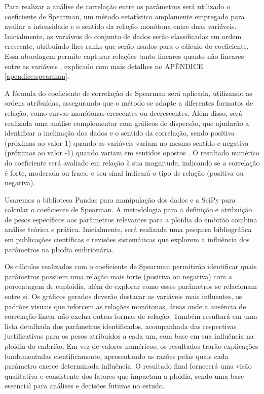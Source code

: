 Para realizar a análise de correlação entre os parâmetros será utilizado o coeficiente de Spearman, um método estatístico amplamente empregado para avaliar a intensidade e o sentido da relação monótona entre duas variáveis. Inicialmente, as variáveis do conjunto de dados serão classificadas em ordem crescente, atribuindo-lhes ranks que serão usados para o cálculo do coeficiente. Essa abordagem permite capturar relações tanto lineares quanto não lineares entre as variáveis \cite{sousa2019}, explicado com mais detalhes no APÊNDICE \ref{apendice:spearman}. 

A fórmula do coeficiente de correlação de Spearman será aplicada, utilizando as ordens atribuídas, assegurando que o método se adapte a diferentes formatos de relação, como curvas monótonas crescentes ou decrescentes. Além disso, será realizada uma análise complementar com gráficos de dispersão, que ajudarão a identificar a inclinação dos dados e o sentido da correlação, sendo positiva (próximas ao valor 1) quando as variáveis variam no mesmo sentido e negativa (próximas ao valor -1) quando variam em sentidos opostos \cite{sousa2019}. O resultado numérico do coeficiente será avaliado em relação à sua magnitude, indicando se a correlação é forte, moderada ou fraca, e seu sinal indicará o tipo de relação (positiva ou negativa). 

Usaremos a biblioteca Pandas para manipulação dos dados e a SciPy para calcular o coeficiente de Spearman. A metodologia para a definição e atribuição de pesos específicos aos parâmetros relevantes para a ploidia do embrião combina análise teórica e prática. Inicialmente, será realizada uma pesquisa bibliográfica em publicações científicas e revisões sistemáticas que explorem a influência dos parâmetros na ploidia embrionária.

Os cálculos realizados com o coeficiente de Spearman permitirão identificar quais parâmetros possuem uma relação mais forte (positiva ou negativa) com a porcentagem de euploidia, além de explorar como esses parâmetros se relacionam entre si. Os gráficos gerados deverão destacar as variáveis mais influentes, os padrões visuais que reforcem as relações monótonas, áreas onde a ausência de correlação linear não exclua outras formas de relação. Também resultará em uma lista detalhada dos parâmetros identificados, acompanhada das respectivas justificativas para os pesos atribuídos a cada um, com base em sua influência na ploidia do embrião. Em vez de valores numéricos, os resultados trarão explicações fundamentadas cientificamente, apresentando as razões pelas quais cada parâmetro exerce determinada influência. O resultado final fornecerá uma visão qualitativa e consistente dos fatores que impactam a ploidia, sendo uma base essencial para análises e decisões futuras no estudo.


